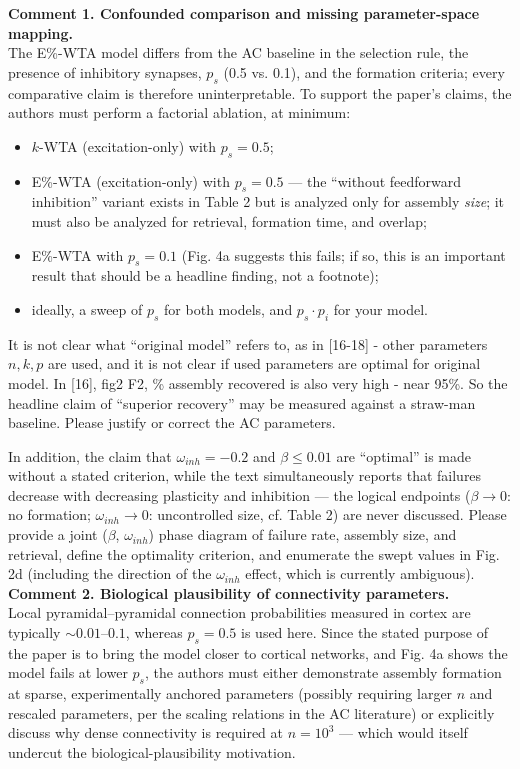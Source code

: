 \documentclass[a4paper, 11pt]{article}
\begin{document}
\noindent\textbf{Comment 1. Confounded comparison and missing parameter-space mapping.}\\
The E\%-WTA model differs from the AC baseline in the selection rule, the presence of inhibitory synapses, $p_s$ (0.5 vs. 0.1), and the formation criteria; every comparative claim is therefore uninterpretable. To support the paper's claims, the authors must perform a factorial ablation, at minimum:
\begin{itemize}
    \item $k$-WTA (excitation-only) with $p_s = 0.5$;
    \item E\%-WTA (excitation-only) with $p_s = 0.5$ — the ``without feedforward inhibition'' variant exists in Table 2 but is analyzed only for assembly \emph{size}; it must also be analyzed for retrieval, formation time, and overlap;
    \item E\%-WTA with $p_s = 0.1$ (Fig. 4a suggests this fails; if so, this is an important result that should be a headline finding, not a footnote);
    \item ideally, a sweep of $p_s$ for both models, and $p_s \cdot p_i$ for your model.
\end{itemize}
It is not clear what ``original model'' refers to, as in [16-18] - other parameters $n, k, p$ are used, and it is not clear if used parameters are optimal for original model. In [16], fig2 F2, \% assembly recovered is also very high - near 95\%. So the headline claim of ``superior recovery'' may be measured against a straw-man baseline. Please justify or correct the AC parameters.

In addition, the claim that $\omega_{inh} = -0.2$ and $\beta \le 0.01$ are ``optimal'' is made without a stated criterion, while the text simultaneously reports that failures decrease with decreasing plasticity and inhibition — the logical endpoints ($\beta \rightarrow 0$: no formation; $\omega_{inh} \rightarrow 0$: uncontrolled size, cf. Table 2) are never discussed. Please provide a joint ($\beta$, $\omega_{inh}$) phase diagram of failure rate, assembly size, and retrieval, define the optimality criterion, and enumerate the swept values in Fig. 2d (including the direction of the $\omega_{inh}$ effect, which is currently ambiguous).\\

\noindent\textbf{Comment 2. Biological plausibility of connectivity parameters.}\\
Local pyramidal–pyramidal connection probabilities measured in cortex are typically $\sim0.01\text{--}0.1$, whereas $p_s = 0.5$ is used here. Since the stated purpose of the paper is to bring the model closer to cortical networks, and Fig. 4a shows the model fails at lower $p_s$, the authors must either demonstrate assembly formation at sparse, experimentally anchored parameters (possibly requiring larger $n$ and rescaled parameters, per the scaling relations in the AC literature) or explicitly discuss why dense connectivity is required at $n = 10^3$ — which would itself undercut the biological-plausibility motivation.\\
\end{document}

